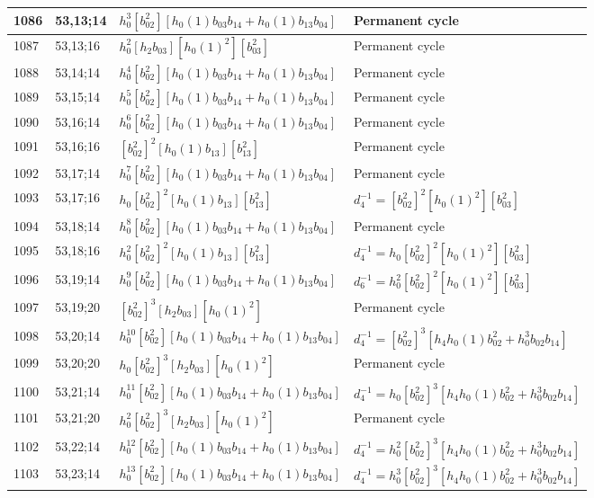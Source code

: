 \documentclass{article}
\begin{document}
\begin{longtable}{|l|l|>{\raggedright\arraybackslash}p{6cm}|>{\raggedright\arraybackslash}p{6cm}|}
\hline
1086 & 53,13;14 & $h_0^3[b_{02}^2][h_0(1)b_{03}b_{14} + h_0(1)b_{13}b_{04}]$ & Permanent cycle\\
\hline
1087 & 53,13;16 & $h_0^2[h_2b_{03}][h_0(1)^2][b_{03}^2]$ & Permanent cycle\\
\hline
1088 & 53,14;14 & $h_0^4[b_{02}^2][h_0(1)b_{03}b_{14} + h_0(1)b_{13}b_{04}]$ & Permanent cycle\\
\hline
1089 & 53,15;14 & $h_0^5[b_{02}^2][h_0(1)b_{03}b_{14} + h_0(1)b_{13}b_{04}]$ & Permanent cycle\\
\hline
1090 & 53,16;14 & $h_0^6[b_{02}^2][h_0(1)b_{03}b_{14} + h_0(1)b_{13}b_{04}]$ & Permanent cycle\\
\hline
1091 & 53,16;16 & $[b_{02}^2]^2[h_0(1)b_{13}][b_{13}^2]$ & Permanent cycle\\
\hline
1092 & 53,17;14 & $h_0^7[b_{02}^2][h_0(1)b_{03}b_{14} + h_0(1)b_{13}b_{04}]$ & Permanent cycle\\
\hline
1093 & 53,17;16 & $h_0[b_{02}^2]^2[h_0(1)b_{13}][b_{13}^2]$ & $d_{4}^{-1}=[b_{02}^2]^2[h_0(1)^2][b_{03}^2]$\\
\hline
1094 & 53,18;14 & $h_0^8[b_{02}^2][h_0(1)b_{03}b_{14} + h_0(1)b_{13}b_{04}]$ & Permanent cycle\\
\hline
1095 & 53,18;16 & $h_0^2[b_{02}^2]^2[h_0(1)b_{13}][b_{13}^2]$ & $d_{4}^{-1}=h_0[b_{02}^2]^2[h_0(1)^2][b_{03}^2]$\\
\hline
1096 & 53,19;14 & $h_0^9[b_{02}^2][h_0(1)b_{03}b_{14} + h_0(1)b_{13}b_{04}]$ & $d_{6}^{-1}=h_0^2[b_{02}^2]^2[h_0(1)^2][b_{03}^2]$\\
\hline
1097 & 53,19;20 & $[b_{02}^2]^3[h_2b_{03}][h_0(1)^2]$ & Permanent cycle\\
\hline
1098 & 53,20;14 & $h_0^{10}[b_{02}^2][h_0(1)b_{03}b_{14} + h_0(1)b_{13}b_{04}]$ & $d_{4}^{-1}=[b_{02}^2]^3[h_4h_0(1)b_{02}^2 + h_0^3b_{02}b_{14}]$\\
\hline
1099 & 53,20;20 & $h_0[b_{02}^2]^3[h_2b_{03}][h_0(1)^2]$ & Permanent cycle\\
\hline
1100 & 53,21;14 & $h_0^{11}[b_{02}^2][h_0(1)b_{03}b_{14} + h_0(1)b_{13}b_{04}]$ & $d_{4}^{-1}=h_0[b_{02}^2]^3[h_4h_0(1)b_{02}^2 + h_0^3b_{02}b_{14}]$\\
\hline
1101 & 53,21;20 & $h_0^2[b_{02}^2]^3[h_2b_{03}][h_0(1)^2]$ & Permanent cycle\\
\hline
1102 & 53,22;14 & $h_0^{12}[b_{02}^2][h_0(1)b_{03}b_{14} + h_0(1)b_{13}b_{04}]$ & $d_{4}^{-1}=h_0^2[b_{02}^2]^3[h_4h_0(1)b_{02}^2 + h_0^3b_{02}b_{14}]$\\
\hline
1103 & 53,23;14 & $h_0^{13}[b_{02}^2][h_0(1)b_{03}b_{14} + h_0(1)b_{13}b_{04}]$ & $d_{4}^{-1}=h_0^3[b_{02}^2]^3[h_4h_0(1)b_{02}^2 + h_0^3b_{02}b_{14}]$\\

\end{longtable}
\end{document}
